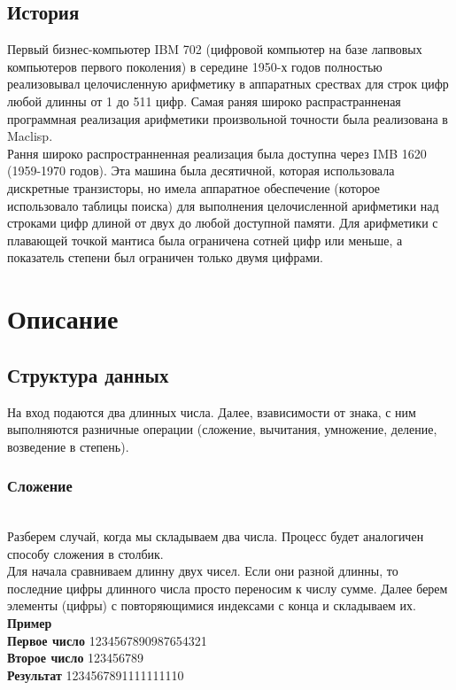 \documentclass[a4paper]{article}
\begin{document}
\subsection{История}
Первый бизнес-компьютер IBM 702 (цифровой компьютер на базе лапвовых компьютеров первого поколения) в середине 1950-х годов полностью реализовывал целочисленную арифметику в аппаратных срествах для строк цифр любой длинны от 1 до 511 цифр. Самая раняя широко распрастранненая программная реализация арифметики произвольной точности была реализована в Maclisp. 
\\Рання широко распространненная реализация была доступна через IMB 1620 (1959-1970 годов). Эта машина была десятичной, которая использовала дискретные транзисторы, но имела аппаратное обеспечение (которое использовало таблицы поиска) для выполнения целочисленной арифметики над строками цифр длиной от двух до любой доступной памяти. Для арифметики с плавающей точкой мантиса была ограничена сотней цифр или меньше, а показатель степени был ограничен только двумя цифрами. 
\newpage

\section{Описание}
\subsection{Структура данных}
На вход подаются два длинных числа. Далее, взависимости от знака, с ним выполняются разничные операции (сложение, вычитания, умножение, деление, возведение в степень).

\subsubsection{Сложение}
\\Разберем случай, когда мы складываем два числа. Процесс будет аналогичен способу сложения в столбик.
\\Для начала сравниваем длинну двух чисел. Если они разной длинны, то последние цифры длинного числа просто переносим к числу сумме. Далее берем элементы (цифры) с повторяющимися индексами с конца и складываем их. 
\\ \textbf{Пример}
\\ \textbf{Первое число} 1234567890987654321
\\ \textbf{Второе число} 123456789
\\ \textbf{Результат} 1234567891111111110
\end{document}

